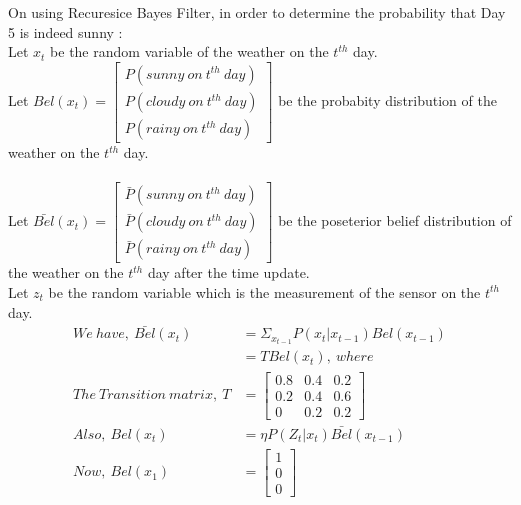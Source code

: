 \documentclass[a4paper,fleqn,11pt]{article}
\theoremstyle{mytheor}
\begin{document}
\section{}
On using Recuresice Bayes Filter, in order to determine the probability that Day 5 is indeed sunny : \\
Let $x_t$ be the random variable of the weather on the $t^{th}$ day. \\
Let $Bel(x_t) = \begin{bmatrix}
					P (sunny\ on\ t^{th}\ day) \\
					P (cloudy\ on\ t^{th}\ day) \\
					P (rainy\ on\ t^{th}\ day)
			    \end{bmatrix}$ be the probabity distribution of the weather on the $t^{th}$ day. \\ \\
Let $\bar{Bel}(x_t) = \begin{bmatrix}
							\bar{P} (sunny\ on\ t^{th}\ day) \\
							\bar{P} (cloudy\ on\ t^{th}\ day) \\
							\bar{P} (rainy\ on\ t^{th}\ day)
				 	   \end{bmatrix}$ be the poseterior belief distribution of the weather on the $t^{th}$ day after the time update.  \\ 
Let $z_t$ be the random variable which is the measurement of the sensor on the $t^{th}$ day.
\begin{align*}
We\ have,\ \bar{Bel}(x_t) & = \Sigma_{x_{t-1}} P(x_t | x_{t-1}) Bel(x_{t-1})\\
& = T Bel(x_t),\ where \\
The\ Transition\ matrix,\ T & = \begin{bmatrix}
									0.8 & 0.4 & 0.2 \\
									0.2 & 0.4 & 0.6 \\
									0   & 0.2 & 0.2
								 \end{bmatrix} \\
Also,\ Bel(x_t) & = \eta P (Z_t | x_t) \bar{Bel}(x_{t-1}) \\
Now,\ Bel(x_1) & = \begin{bmatrix}
						1 \\
						0 \\
						0
			  		\end{bmatrix}
\end{align*}
\end{document}
